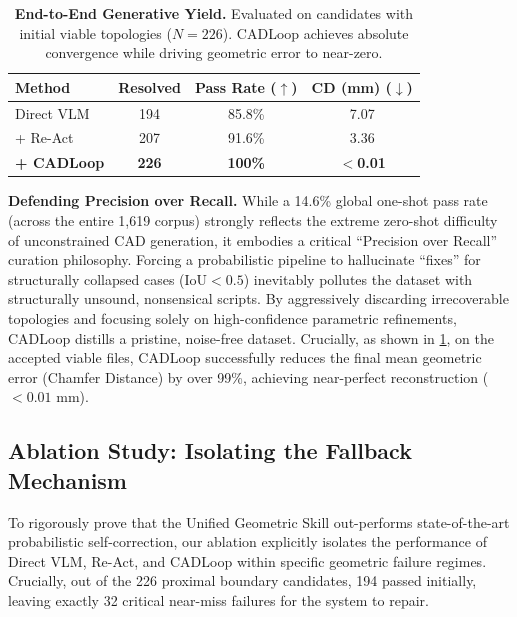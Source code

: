 \begin{table}[h]
  \centering
  \small
  \setlength{\tabcolsep}{4pt}
  \caption{\textbf{End-to-End Generative Yield.} Evaluated on candidates with initial viable topologies ($N=226$). CADLoop achieves absolute convergence while driving geometric error to near-zero.}
  \label{tab:pipeline}
  \begin{tabular}{@{}lccc@{}}
    \toprule
    \textbf{Method} & \textbf{Resolved} & \textbf{Pass Rate} ($\uparrow$) & \textbf{CD (mm)} ($\downarrow$) \\
    \midrule
    Direct VLM      & 194 & 85.8\% & 7.07 \\
    + Re-Act        & 207 & 91.6\% & 3.36 \\
    \textbf{+ CADLoop} & \textbf{226} & \textbf{100\%} & \textbf{$<$0.01} \\
    \bottomrule
  \end{tabular}
\end{table}

\noindent\textbf{Defending Precision over Recall.}
While a 14.6\% global one-shot pass rate (across the entire 1,619 corpus) strongly reflects the extreme zero-shot difficulty of unconstrained CAD generation, it embodies a critical ``Precision over Recall'' curation philosophy. Forcing a probabilistic pipeline to hallucinate ``fixes'' for structurally collapsed cases ($\text{IoU} < 0.5$) inevitably pollutes the dataset with structurally unsound, nonsensical scripts. By aggressively discarding irrecoverable topologies and focusing solely on high-confidence parametric refinements, CADLoop distills a pristine, noise-free dataset. Crucially, as shown in \cref{tab:pipeline}, on the accepted viable files, CADLoop successfully reduces the final mean geometric error (Chamfer Distance) by over 99\%, achieving near-perfect reconstruction ($<0.01$ mm).

\subsection{Ablation Study: Isolating the Fallback Mechanism}

To rigorously prove that the Unified Geometric Skill out-performs state-of-the-art probabilistic self-correction, our ablation explicitly isolates the performance of Direct VLM, Re-Act, and CADLoop within specific geometric failure regimes. Crucially, out of the 226 proximal boundary candidates, 194 passed initially, leaving exactly 32 critical near-miss failures for the system to repair.

